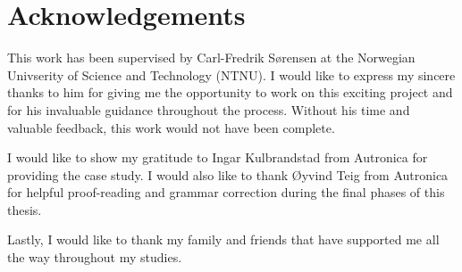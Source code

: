 \section*{\Huge Acknowledgements}
This work has been supervised by Carl-Fredrik Sørensen at the Norwegian Univserity of Science and Technology (NTNU). I would like to express my sincere thanks to him for giving me the opportunity to work on this exciting project and for his invaluable guidance throughout the process. Without his time and valuable feedback, this work would not have been complete. 

I would like to show my gratitude to Ingar Kulbrandstad from Autronica for providing the case study. I would also like to thank Øyvind Teig from Autronica for helpful proof-reading and grammar correction during the final phases of this thesis. 

Lastly, I would like to thank my family and friends that have supported me all the way throughout my studies.